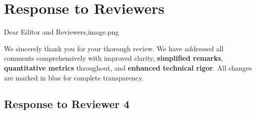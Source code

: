 \documentclass[journal,twoside,web]{ieeecolor}
\begin{document}
\fi  %

\newpage
\section*{Response to Reviewers}

\noindent Dear Editor and Reviewers,image.png

We sincerely thank you for your thorough review. We have addressed all comments comprehensively with improved clarity, \textbf{simplified remarks}, \textbf{quantitative metrics} throughout, and \textbf{enhanced technical rigor}. All changes are marked in {\color{revisionblue}blue} for complete transparency.


\newpage

\subsection*{Response to Reviewer 4}
\end{document}
